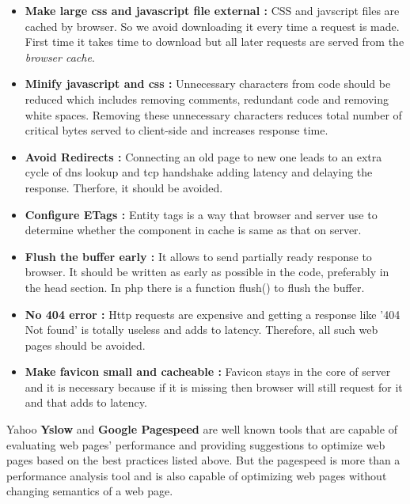 \documentclass[conference]{IEEEtran}
\begin{document}
\begin{itemize}
\item \textbf{Make large css and javascript file external :}
CSS and javscript files are cached by browser. So we avoid downloading it every time a request is made.
First time it takes time to download but all later requests are served from the {\it browser cache}.

\item \textbf{ Minify javascript and css :}
Unnecessary characters from code should be reduced which includes removing
comments, redundant code and removing white spaces. Removing these unnecessary
characters reduces total number of critical bytes served to client-side and increases response time.

\item \textbf{Avoid Redirects :}
Connecting an old page to new one leads to an extra cycle of dns lookup and tcp handshake adding latency
and delaying the response. Therfore, it should be avoided.

\item \textbf{Configure ETags :}
Entity tags is a way that browser and server use to determine whether the
component in cache is same as that on server.

\item \textbf{Flush the buffer early :}
It allows to send partially ready response to browser. It should be written as
early as possible in the code, preferably in the head section.
In php there is a function flush() to flush the buffer. 

\item \textbf{No 404 error :}
Http requests are expensive and getting a response like '404 Not found' is totally useless
and adds to latency. Therefore, all such web pages should be avoided.

\item \textbf{Make favicon small and cacheable :}
Favicon stays in the core of server and  it is necessary because if it is missing then
browser will still request for it and that adds to latency.
\end{itemize}

Yahoo {\bf Yslow}\cite{yslow} and {\bf Google Pagespeed}\cite{gps} are well known tools that are capable of
evaluating web pages' performance and providing suggestions to optimize web pages
based on the best practices listed above. But the pagespeed is more than a performance analysis
tool and is also capable of optimizing web pages without changing semantics of a web page.
\end{document}
